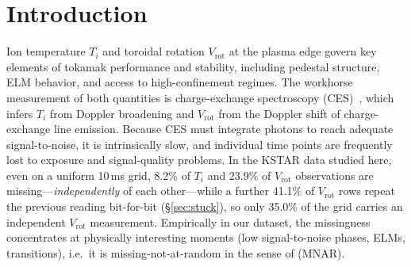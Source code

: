 \documentclass[10pt]{article}
\newcommand{\Ti}{\ensuremath{T_i}}
\newcommand{\Vrot}{\ensuremath{V_\mathrm{rot}}}
\begin{document}
\begin{abstract}
\emph{Rotation.} Under the registered two-level bootstrap over eight new 5-fold
partitions the skill over PCHIP is $[+0.07, +0.70]$ (cut) and $[+0.05, +0.68]$
(inclusive), excluding zero (the fold-level overlap-corrected interval,
$[-0.02, +0.41]$, still spans zero). It is a tail-carried gain from the CES history
alone. The \Vrot{} branch reads no fast channel, and that routing is measured rather
than assumed: the fast channels correlate with $d\Vrot/dt$ at $-0.006$ (BES) and
$-0.003$ (ECEI), against $+0.070$ and $+0.078$ with $d\Ti/dt$. The 100\,Hz Mirnov
values are single raw samples (24 of 24 coils checked), registered features of the
raw 2\,MHz stream change the \Vrot{} skill by $-0.128$ $[-0.544, -0.105]$ (cut; three
test discharges), and the NBI torque is a step input whose slow band carries 0.34\%
of the 10\,ms increment variance. In the median the nowcaster is worse than
persistence; the physics filter's error ratio to persistence is 0.94--1.00 with the
interval including 1 on 3/4 splits, which is the photon floor of a 10\,ms line fit.
The rotation statement is scoped to standard CES at 10\,ms from the core to the
pedestal top.

The aggregate skill is a tail statistic, the offline claim is bounded above by the
offline GP, the value cut is a proxy for fit quality, and everything is one device
and one campaign. We release the pipeline, the pre-registrations and the evaluation artifacts.
\end{abstract}

\section{Introduction}
\label{sec:intro}

Ion temperature \Ti{} and toroidal rotation \Vrot{} at the plasma edge govern key
elements of tokamak performance and stability, including pedestal structure, ELM
behavior, and access to high-confinement regimes. The workhorse measurement of both
quantities is charge-exchange spectroscopy (CES)~\citep{Ko2010ChargeExchange},
which infers \Ti{} from Doppler broadening and \Vrot{} from the
Doppler shift of charge-exchange line emission. Because CES must integrate photons
to reach adequate signal-to-noise, it is intrinsically slow, and individual time
points are frequently lost to exposure and signal-quality problems. In the KSTAR
data studied here, even on a uniform 10\,ms grid, 8.2\% of \Ti{} and
23.9\% of \Vrot{} observations are missing---\emph{independently} of each
other---while a further 41.1\% of \Vrot{} rows repeat the previous reading
bit-for-bit (\S\ref{sec:stuck}), so only 35.0\% of the grid carries an independent
\Vrot{} measurement. Empirically in our dataset, the missingness concentrates at
physically interesting moments (low signal-to-noise phases, ELMs, transitions),
i.e.\ it is missing-not-at-random in the sense of
\citet{Little2002StatisticalAnalysis} (MNAR).
\end{document}
